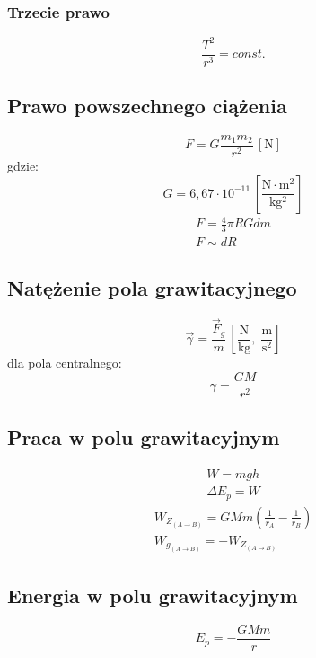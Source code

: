 \documentclass{article}
\numberwithin{equation}{section}
\newcommand{\unit}[1]{\, \left[\mathrm{#1}\right]}
\begin{document}
      \subsubsection{Trzecie prawo}
        \begin{equation}
          \frac{T^2}{r^3} = const.
        \end{equation}
    \subsection{Prawo powszechnego ciążenia}
      \begin{equation}
        F = G\frac{m_1m_2}{r^2} \unit{N}
      \end{equation}
      gdzie:
      \begin{equation}
        G = 6,67\cdot 10^{-11} \unit{\frac{N\cdot m^2}{kg^2}}
      \end{equation}
      \begin{gather}
        F = \frac{4}{3}\pi RGdm\\
        F \sim dR
      \end{gather}
    \subsection{Natężenie pola grawitacyjnego}
      \begin{equation}
        \vec\gamma = \frac{\vec F_g}{m} \unit{\frac{N}{kg},\;\frac{m}{s^2}}
      \end{equation}
      dla pola centralnego:
      \begin{equation}
        \gamma = \frac{GM}{r^2}
      \end{equation}
    \subsection{Praca w polu grawitacyjnym}
      \begin{gather}
        W = mgh\\
        \Delta E_p = W
      \end{gather}
      \begin{gather}
        W_{Z_{(A\rightarrow B)}} = GMm\left(\frac{1}{r_A} - \frac{1}{r_B}\right)\\
        W_{g_{(A\rightarrow B)}} = -W_{Z_{(A\rightarrow B)}}
      \end{gather}
    \subsection{Energia w polu grawitacyjnym}
      \begin{equation}
        E_p = -\frac{GMm}{r}
      \end{equation}
\end{document}

